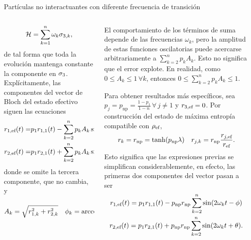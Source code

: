 \begin{frame}{Partículas no interactuantes con diferente frecuencia de transición}
    \begin{columns}
        \begin{column}{0.5\textwidth}
            \begin{equation}
                \mathcal{H}=\sum_{k=1}^{n}\omega_{k}\sigma_{3,k},\nonumber
            \end{equation}
            de tal forma que toda la evolución mantenga constante la componente en $\sigma_{3}$. Explícitamente, las componentes del vector de Bloch del estado efectivo siguen las ecuaciones
            \begin{align}
                r_{1,\text{ef}}(t)=&p_{1}r_{1,1}(t)-\sum_{k=2}^{n}p_{k}A_{k}\sin(2\omega_{k} t-\phi_{k})\nonumber\\
                r_{2,\text{ef}}(t)=&p_{1}r_{2,1}(t)+\sum_{k=2}^{n}p_{k}A_{k}\sin(2\omega_{k} t+\theta_{k}),\nonumber
            \end{align}
            donde se omite la tercera componente, que no cambia, y
            \begin{align}
                A_{k}=\sqrt{r_{1,k}^{2}+r_{2,k}^{2}} & & \phi_{k}=\arccos\qty(\frac{r_{2,k}}{\sqrt{r_{1,k}^{2}+r_{2,k}^{2}}}) & & \theta_{k}=\arcsin\qty(\frac{r_{1,k}}{\sqrt{r_{1,k}^{2}+r_{2,k}^{2}}}).\nonumber
            \end{align}
        \end{column}
        \begin{column}{0.5\textwidth}
            El comportamiento de los términos de suma depende de las frecuencias $\omega_{k}$, pero la amplitud de estas funciones oscilatorias puede acercarse arbitrariamente a $\sum_{k=2}^{n} p_{k} A_{k}$. Esto no significa que el error explote. En realidad, como $0\leq A_{k}\leq 1\,\forall k$, entonces $0\leq\sum_{k=2}^{n} p_{k} A_{k}\leq 1$. 


Para obtener resultados más específicos, sea $p_{j}=p_{\text{np}}=\frac{1-p_{1}}{1-n}\,\forall\,j\neq 1$ y $r_{3,\text{ef}}=0$. Por construcción del estado de máxima entropía compatible con $\rho_{\text{ef}}$,
\begin{align}
    r_{k}=r_{\text{np}}=\tanh(p_{\text{np}} \lambda) & & r_{j,k}=r_{\text{np}}\frac{r_{j,\text{ef}}}{r_{\text{ef}}}.\nonumber
\end{align}
Esto significa que las expresiones previas se simplifican considerablemente, en efecto, las primeras dos componentes del vector pasan a ser
\begin{equation}\label{eq:}
    \begin{gathered}
        r_{1,\text{ef}}(t)=p_{1}r_{1,1}(t)-p_{\text{np}}r_{\text{np}}\sum_{k=2}^{n}\sin(2\omega_{k} t-\phi)\\
        r_{2,\text{ef}}(t)=p_{1}r_{2,1}(t)+p_{\text{np}}r_{\text{np}}\sum_{k=2}^{n}\sin(2\omega_{k} t+\theta).
    \end{gathered}
\end{equation}
        \end{column}
    \end{columns}
\end{frame}

